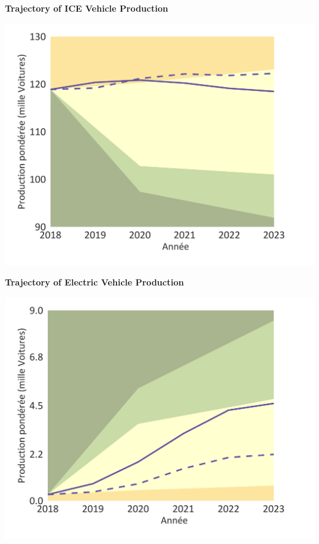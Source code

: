 \documentclass[10pt,table]{article}\usepackage[]{graphicx}\usepackage[]{color}
\begin{document}
	\begin{minipage}[t]{.49\linewidth}
		\textbf{Trajectory of ICE Vehicle Production}

		\includegraphics[trim = {0 0cm 0 0},width=1\linewidth]{ReportOutputs/Fig14}

	\end{minipage}	
	\hspace{.02\linewidth}
	\begin{minipage}[t]{.49\textwidth}
		\textbf{Trajectory of Electric Vehicle Production}

		\includegraphics[trim = {0 0cm 0 0},width=1\linewidth]{ReportOutputs/Fig15}

	\end{minipage}	
\end{document}
